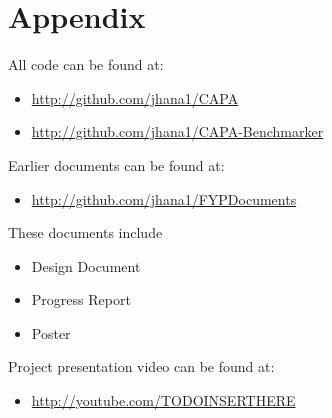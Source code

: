 \section{Appendix}
All code can be found at:
\begin{itemize}
    \item\url{http://github.com/jhana1/CAPA}
    \item\url{http://github.com/jhana1/CAPA-Benchmarker}
\end{itemize}
Earlier documents can be found at:
\begin{itemize}
    \item\url{http://github.com/jhana1/FYPDocuments}
\end{itemize}
These documents include
\begin{itemize}
    \item Design Document
    \item Progress Report
    \item Poster
\end{itemize}
Project presentation video can be found at:
\begin{itemize}
    \item\url{http://youtube.com/TODOINSERTHERE}
\end{itemize}



